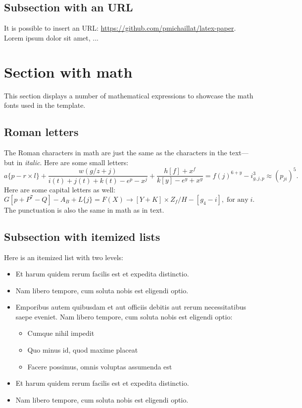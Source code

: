 \documentclass[letterpaper,11pt,leqno]{article}
\begin{document}
\subsection{Subsection with an URL}

It is possible to insert an URL: \url{https://github.com/pmichaillat/latex-paper}. Lorem ipsum dolor sit amet, ...

\section{Section with math}\label{s:math}

This section displays a number of mathematical expressions to showcase the math fonts used in the template.

\subsection{Roman letters} 

The Roman characters in math are just the same as the characters in the text---but in \textit{italic}. Here are some small letters: 
\begin{equation*}
a\{p - r \times l\} + \frac{w(g/z+j)}{i(t)+j(t)+k(t) - e^p - x^j} + \frac{h[f]+x^f}{k[y]-e^y + x^y} = f(j)^{6+y} - i^3_{g,j,p} \approx (p_{ji})^5.
\end{equation*}
Here are some capital letters as well: 
\begin{equation*}
G[p + P^7-Q] - A_B + L\{j\} = F(X) \to [Y+K]\times Z_f/H - [g_4 - i],\;\text{for any}\;i.
\end{equation*}
The punctuation is also the same in math as in text. 

\subsection{Subsection with itemized lists}

Here is an itemized list with two levels:
\begin{itemize}
\item Et harum quidem rerum facilis est et expedita distinctio.
\item Nam libero tempore, cum soluta nobis est eligendi optio.
\item Emporibus autem quibusdam et aut officiis debitis aut rerum necessitatibus saepe eveniet. Nam libero tempore, cum soluta nobis est eligendi optio:
\begin{itemize}
\item Cumque nihil impedit
\item Quo minus id, quod maxime placeat
\item Facere possimus, omnis voluptas assumenda est
\end{itemize}
\item Et harum quidem rerum facilis est et expedita distinctio.
\item Nam libero tempore, cum soluta nobis est eligendi optio.
\end{itemize}
\end{document}
